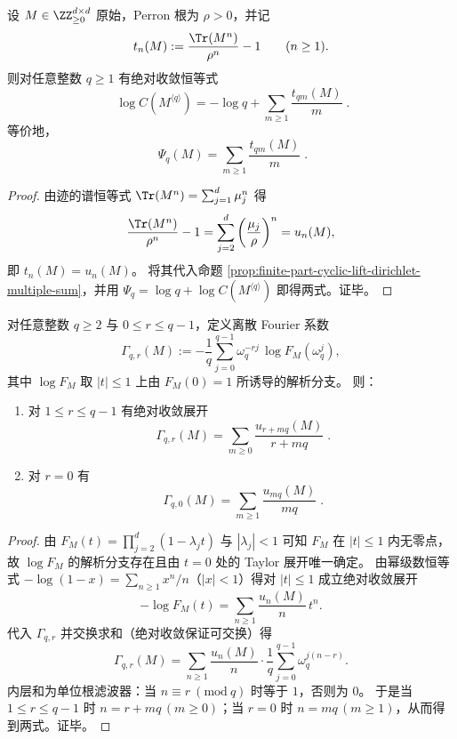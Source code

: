 \begin{corollary}\label{cor:finite-part-cyclic-lift-trace-sieve}
设 \(M\in\ZZ_{\ge 0}^{d\times d}\) 原始，Perron 根为 \(\rho>0\)，并记
\[
t_n(M):=\frac{\Tr(M^n)}{\rho^n}-1\qquad(n\ge 1).
\]
则对任意整数 \(q\ge 1\) 有绝对收敛恒等式
\[
\boxed{\;
\log C(M^{\langle q\rangle})
=-\log q+\sum_{m\ge 1}\frac{t_{qm}(M)}{m}\; }.
\]
等价地，
\[
\boxed{\;
\Psi_q(M)=\sum_{m\ge 1}\frac{t_{qm}(M)}{m}\; }.
\]
\end{corollary}
\begin{proof}
由迹的谱恒等式 \(\Tr(M^n)=\sum_{j=1}^{d}\mu_j^n\) 得
\[
\frac{\Tr(M^n)}{\rho^n}-1=\sum_{j=2}^{d}\left(\frac{\mu_j}{\rho}\right)^{n}=u_n(M),
\]
即 \(t_n(M)=u_n(M)\)。
将其代入命题 \ref{prop:finite-part-cyclic-lift-dirichlet-multiple-sum}，并用 \(\Psi_q=\log q+\log C(M^{\langle q\rangle})\) 即得两式。证毕。
\end{proof}

\begin{proposition}\label{prop:finite-part-cyclic-lift-root-unity-fourier-sieve}
对任意整数 \(q\ge 2\) 与 \(0\le r\le q-1\)，定义离散 Fourier 系数
\[
\Gamma_{q,r}(M):=-\frac{1}{q}\sum_{j=0}^{q-1}\omega_q^{-rj}\,\log F_M(\omega_q^j),
\]
其中 \(\log F_M\) 取 \(|t|\le 1\) 上由 \(F_M(0)=1\) 所诱导的解析分支。
则：
\begin{enumerate}
  \item 对 \(1\le r\le q-1\) 有绝对收敛展开
  \[
  \boxed{\;
  \Gamma_{q,r}(M)=\sum_{m\ge 0}\frac{u_{r+mq}(M)}{r+mq}\; }.
  \]
  \item 对 \(r=0\) 有
  \[
  \boxed{\;
  \Gamma_{q,0}(M)=\sum_{m\ge 1}\frac{u_{mq}(M)}{mq}\; }.
  \]
\end{enumerate}
\end{proposition}
\begin{proof}
由 \(F_M(t)=\prod_{j=2}^{d}(1-\lambda_j t)\) 与 \(|\lambda_j|<1\) 可知 \(F_M\) 在 \(|t|\le 1\) 内无零点，故 \(\log F_M\) 的解析分支存在且由 \(t=0\) 处的 Taylor 展开唯一确定。
由幂级数恒等式 \(-\log(1-x)=\sum_{n\ge 1}x^n/n\)（\(|x|<1\)）得对 \(|t|\le 1\) 成立绝对收敛展开
\[
-\log F_M(t)=\sum_{n\ge 1}\frac{u_n(M)}{n}\,t^n.
\]
代入 \(\Gamma_{q,r}\) 并交换求和（绝对收敛保证可交换）得
\[
\Gamma_{q,r}(M)=\sum_{n\ge 1}\frac{u_n(M)}{n}\cdot \frac{1}{q}\sum_{j=0}^{q-1}\omega_q^{j(n-r)}.
\]
内层和为单位根滤波器：当 \(n\equiv r\ (\mathrm{mod}\ q)\) 时等于 \(1\)，否则为 \(0\)。
于是当 \(1\le r\le q-1\) 时 \(n=r+mq\,(m\ge 0)\)；当 \(r=0\) 时 \(n=mq\,(m\ge 1)\)，从而得到两式。证毕。
\end{proof}

